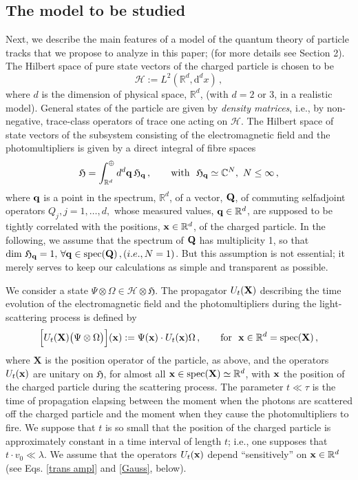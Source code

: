 \documentclass[11pt]{article}
\renewcommand{\d}{{\mathrm d}}
\begin{document}
\subsection{The model to be studied}\label{mod}
Next, we describe the main features of a model of the quantum theory of particle tracks that we propose to analyze in this paper; (for more details see Section 2). The Hilbert space of pure state vectors of the charged particle is chosen to be
\begin{equation}\label{Hilbert}
\mathcal{H}:= L^{2}(\mathbb{R}^{d}, \d^{d}x)\,,
\end{equation}
where $d$ is the dimension of physical space, $\mathbb{R}^{d}$, (with $d=2$ or $3$, in a realistic model).
General states of the particle are given by \textit{density matrices}, i.e., by non-negative, trace-class 
operators of trace one acting on $\mathcal{H}$. The Hilbert space of state vectors of the subsystem consisting of the electromagnetic field and the photomultipliers is given by a direct integral of fibre spaces 
$$\mathfrak{H} = \int^{\oplus}_{\mathbb{R}^{d}} d^{d}{\bf{q}}\, \mathfrak{H}_{{\bf{q}}}\,, \qquad \text{with  }\,\, 
\mathfrak{H}_{{\bf{q}}} \simeq \mathbb{C}^{N}, \, \, N\leq \infty\,,$$ 
where ${\bf{q}}$ is a point in the spectrum, $\mathbb{R}^{d}$, of a vector, ${\bf{Q}}$, of commuting selfadjoint operators $Q_{j}, j=1,\dots,d,$ whose measured values, ${\bf{q}} \in \mathbb{R}^{d}$, are supposed to be tightly correlated 
with the positions, ${\bf{x}} \in \mathbb{R}^{d}$, of the charged particle. In the following, we assume that the spectrum of 
${\bf{Q}}$ has multiplicity 1, so that $\text{dim } \mathfrak{H}_{{\bf{q}}} = 1, \, \forall {\bf{q}} \in \text{spec}({\bf{Q}})\,, (i.e., 
N=1)$. But this assumption is not essential; it merely serves to keep our calculations as simple and transparent as possible.

We consider a state 
$\Psi \otimes \Omega \in \mathcal{H}\otimes \mathfrak{H}$. The propagator $U_{t}({\bf{X}})$ describing the time evolution of the electromagnetic field and the photomultipliers during the light-scattering process is defined by
\begin{equation}\label{prop}
\Big[U_{t}({\bf{X}}) \big( \Psi \otimes \Omega \big)\Big]({\bf{x}}):= \Psi({\bf{x}})\cdot U_{t}({\bf{x}})\Omega\,, \qquad \text{for  }\,\, {\bf{x}}\in \mathbb{R}^{d}= \text{spec}({\bf{X}})\,,
\end{equation}
where $\mathbf{X}$ is the position operator of the particle, as above, and the operators $U_{t}({\bf{x}})$ 
are unitary on $\mathfrak{H}$, for almost all ${\bf{x}}\in \text{spec}(\mathbf{X}) \simeq \mathbb{R}^{d}$, 
with ${\bf{x}}$ the position of the charged particle during the scattering process. 
The parameter $t\ll \tau$ is the time of propagation elapsing between the moment when the photons are scattered 
off the charged particle and the moment when they cause the photomultipliers to fire. We suppose that $t$ is so small 
that the position of the charged particle is approximately constant in a time interval of length $t$; i.e., one supposes that 
$t\cdot v_0 \ll \lambda$. We assume that the operators $U_{t}({\bf{x}})$ depend ``sensitively'' on ${\bf{x}} \in \mathbb{R}^{d}$ (see Eqs. \eqref{trans ampl} and \eqref{Gauss}, below).
\end{document}
